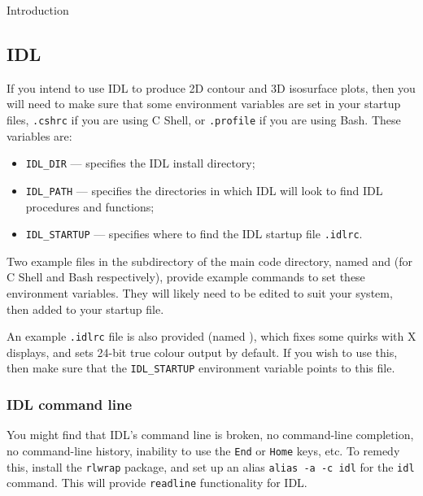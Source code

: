 \begin{chapter}{\label{cha:introduction}Introduction}
  \subsection{\label{subsec:idl_setup}IDL}
  If you intend to use IDL to produce 2D contour and 3D isosurface plots, then
  you will need to make sure that some environment variables are set in your
  startup files, \eg \verb".cshrc" if you are using C Shell, or \verb".profile"
  if you are using Bash.  These variables are:
  \begin{itemize}
    \item \verb"IDL_DIR" --- specifies the IDL install directory;
    \item \verb"IDL_PATH" --- specifies the directories in which IDL will look
      to find IDL procedures and functions;
    \item \verb"IDL_STARTUP" --- specifies where to find the IDL startup file
      \verb".idlrc".
  \end{itemize}
  Two example files in the  subdirectory of the main code
  directory, named  and  (for C Shell
  and Bash respectively), provide example commands to set these environment
  variables.  They will likely need to be edited to suit your system, then
  added to your startup file.

  An example \verb".idlrc" file is also provided (named ),
  which fixes some quirks with X displays, and sets 24-bit true colour output
  by default.  If you wish to use this, then make sure that the
  \verb"IDL_STARTUP" environment variable points to this file.

  \subsubsection{IDL command line}
  You might find that IDL's command line is broken, \ie no command-line
  completion, no command-line history, inability to use the \texttt{End} or
  \texttt{Home} keys, etc.  To remedy this, install the \texttt{rlwrap}
  package, and set up an alias \texttt{alias -a -c idl} for the \texttt{idl}
  command.  This will provide \texttt{readline} functionality for IDL.


\end{chapter}
